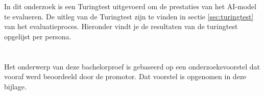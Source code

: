 \documentclass[dutch,dit,thesis]{hogentreport}
\begin{document}








%
%



\appendix
\chapter{}%
\label{ch:code_fragments}



\chapter{}%
In dit onderzoek is een Turingtest uitgevoerd om de prestaties van het AI-model te evalueren. De uitleg van de Turingtest zijn te vinden in sectie \ref{sec:turingtest} van het evaluatieproces. Hieronder vindt je de resultaten van de turingtest opgelijst per persona. 


\chapter{}%
Het onderwerp van deze bachelorproef is gebaseerd op een onderzoeksvoorstel dat vooraf werd beoordeeld door de promotor. Dat voorstel is opgenomen in deze bijlage.



%
%
%
%
%
\end{document}
